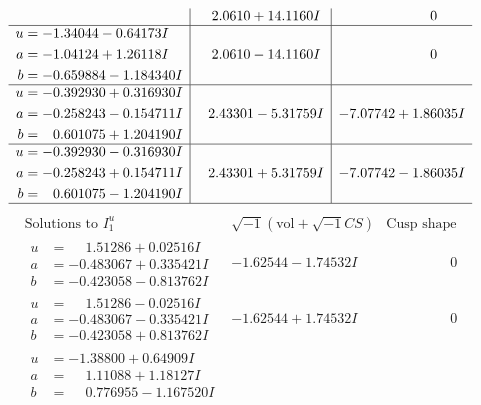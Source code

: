 \documentclass[1p]{elsarticle_modified}
\theoremstyle{definition}
\newcommand{\I}{\sqrt{-1}}
\begin{document}
$$\begin{array}{c|c|c}
 & \phantom{-}2.0610 + 14.1160 I & \phantom{-0.000000 } 0 \\ \hline\begin{aligned}
u &= -1.34044 - 0.64173 I \\
a &= -1.04124 + 1.26118 I \\
b &= -0.659884 - 1.184340 I\end{aligned}
 & \phantom{-}2.0610 - 14.1160 I & \phantom{-0.000000 } 0 \\ \hline\begin{aligned}
u &= -0.392930 + 0.316930 I \\
a &= -0.258243 - 0.154711 I \\
b &= \phantom{-}0.601075 + 1.204190 I\end{aligned}
 & \phantom{-}2.43301 - 5.31759 I & -7.07742 + 1.86035 I \\ \hline\begin{aligned}
u &= -0.392930 - 0.316930 I \\
a &= -0.258243 + 0.154711 I \\
b &= \phantom{-}0.601075 - 1.204190 I\end{aligned}
 & \phantom{-}2.43301 + 5.31759 I & -7.07742 - 1.86035 I\\
 \hline 
 \end{array}$$\newpage$$\begin{array}{c|c|c}  
\text{Solutions to }I^u_{1}& \I (\text{vol} + \sqrt{-1}CS) & \text{Cusp shape}\\
 \hline 
\begin{aligned}
u &= \phantom{-}1.51286 + 0.02516 I \\
a &= -0.483067 + 0.335421 I \\
b &= -0.423058 - 0.813762 I\end{aligned}
 & -1.62544 - 1.74532 I & \phantom{-0.000000 } 0 \\ \hline\begin{aligned}
u &= \phantom{-}1.51286 - 0.02516 I \\
a &= -0.483067 - 0.335421 I \\
b &= -0.423058 + 0.813762 I\end{aligned}
 & -1.62544 + 1.74532 I & \phantom{-0.000000 } 0 \\ \hline\begin{aligned}
u &= -1.38800 + 0.64909 I \\
a &= \phantom{-}1.11088 + 1.18127 I \\
b &= \phantom{-}0.776955 - 1.167520 I\end{aligned}

\end{array}$$
\end{document}

